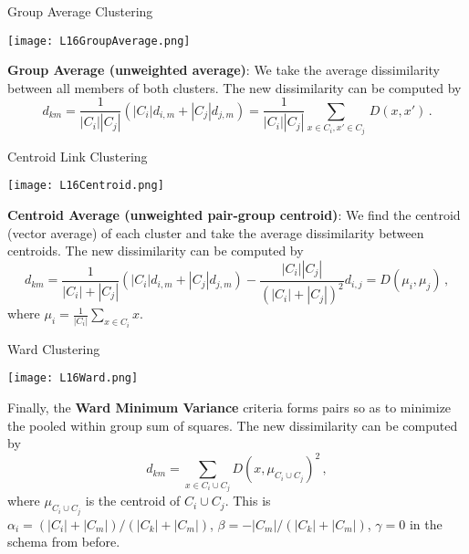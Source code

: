 \documentclass[10pt, table, dvipsnames,xcdraw, handout]{beamer}
\begin{document}
\begin{frame}[fragile]{Group Average Clustering}
  \begin{minipage}[t][0.5\textheight][t]{\textwidth}
	\centering \texttt{[image: L16GroupAverage.png]}
  \end{minipage}
  \vfill
\begin{minipage}[t][0.5\textheight][t]{\textwidth}
\textbf{Group Average (unweighted average)}: We take the average dissimilarity between all members of both clusters. The new dissimilarity can be computed by
$$
d_{km} =  \frac{1}{|C_i||C_j|}(|C_i|d_{i,m} +  |C_j|d_{j,m}) = \frac{1}{|C_i||C_j|}\sum_{x\in C_i, x'\in C_j}\, D(x,x')\,.
$$
\end{minipage}
\end{frame}



\begin{frame}[fragile]{Centroid Link Clustering}
  \begin{minipage}[t][0.5\textheight][t]{\textwidth}
	\centering \texttt{[image: L16Centroid.png]}
  \end{minipage}
  \vfill
\begin{minipage}[t][0.5\textheight][t]{\textwidth}
\textbf{Centroid Average (unweighted pair-group centroid)}: We find the centroid (vector average) of each cluster and take the average dissimilarity between centroids. The new dissimilarity can be computed by
$$
d_{km} =  \frac{1}{|C_i|+|C_j|}(|C_i|d_{i,m} +  |C_j|d_{j,m}) - \frac{|C_i||C_j|}{(|C_i|+|C_j|)^2} d_{i,j}=
D\left( \mu_i, \mu_j  \right)\,,
$$
where $\mu_i = \frac{1}{|C_i|}\sum_{x\in C_i}x$. 
\end{minipage}
\end{frame}


\begin{frame}[fragile]{Ward Clustering}
  \begin{minipage}[t][0.5\textheight][t]{\textwidth}
	\centering \texttt{[image: L16Ward.png]}
  \end{minipage}
  \vfill
\begin{minipage}[t][0.5\textheight][t]{\textwidth}
Finally, the \textbf{Ward Minimum Variance} criteria forms pairs so as to minimize the pooled within group sum of squares. The new dissimilarity can be computed by
$$
d_{km} =\sum_{x\in C_i\cup C_j} D\left( x, \mu_{C_i\cup C_j}  \right)^2\,,
$$
where $\mu_{C_i\cup C_j}$ is the centroid of $C_i\cup C_j$. \pause This is $\alpha_i = (|C_i| + |C_m|)/(|C_k| + |C_m|)$, $\beta = -|C_m|/(|C_k| + |C_m|)$, $\gamma = 0$ in the schema from before. 
\end{minipage}
\end{frame}
\end{document}
